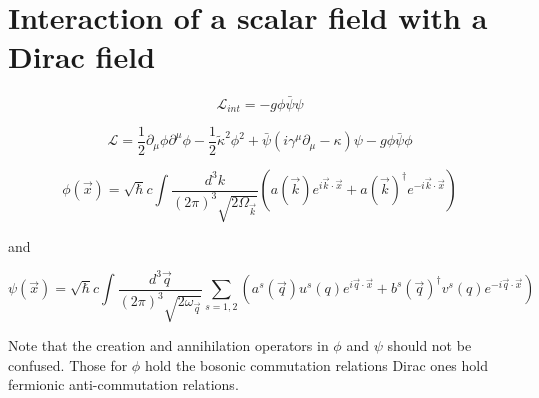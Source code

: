 \documentclass[11pt]{article}
\author{}
\title{}
\date{}
\newcommand{\lag}{\mathcal{L}}
\begin{document}
	
	\pagestyle{fancy}
	\maketitle
	
	\vspace{-8em}
	
	
	\noindent
	
	\vspace{11pt}
	
	\section*{Interaction of a scalar field with a Dirac field}
	
	
	\[ \lag_{int} = -g\phi\bar{\psi}\psi\]
	
	\[ \lag = \frac{1}{2}\partial_\mu\phi\partial^\mu \phi - \frac{1}{2}\tilde{\kappa}^2\phi^2 + \bar{\psi}(i\gamma^\mu\partial_\mu - \kappa) \psi - g\phi\bar{\psi}\phi \]
	
	\[ \phi(\vec{x}) = \sqrt{\hbar} c \int \frac{d^3 k}{(2\pi)^3 \sqrt{2\Omega_{\vec{k}}}} (a(\vec{k})e^{i\vec{k}\cdot \vec{x}}  + a(\vec{k})^\dagger e^{-i\vec{k}\cdot\vec{x}} ) \]
	
	and
	
		\[ \psi(\vec{x}) = \sqrt{\hbar}c \int \frac{d^3\vec{q}}{(2\pi)^3 \sqrt{2\omega_{\vec{q}}}} \sum_{s=1,2} (a^s(\vec{q}) u^s(q)e^{i\vec{q}\cdot\vec{x}} + b^s(\vec{q})^\dagger v^s(q) e^{-i\vec{q}\cdot \vec{x}} )\]
		
		Note that the creation and annihilation operators in $\phi$ and $\psi$ should not be confused. Those for $\phi$ hold the bosonic commutation relations Dirac ones hold fermionic anti-commutation relations.\\
		
\end{document}
